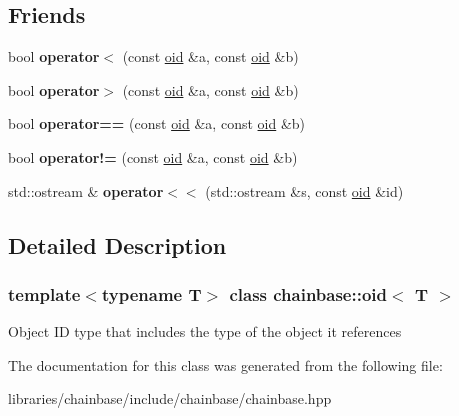 \subsection*{Friends}
\begin{DoxyCompactItemize}
\item 
\mbox{\label{classchainbase_1_1oid_a6d9c7528aadb2de19fed3a45e2879489}} 
bool {\bfseries operator$<$} (const \mbox{\hyperlink{classchainbase_1_1oid}{oid}} \&a, const \mbox{\hyperlink{classchainbase_1_1oid}{oid}} \&b)
\item 
\mbox{\label{classchainbase_1_1oid_a9d142ffef79ede7ed5cba5f2ceaf82d4}} 
bool {\bfseries operator$>$} (const \mbox{\hyperlink{classchainbase_1_1oid}{oid}} \&a, const \mbox{\hyperlink{classchainbase_1_1oid}{oid}} \&b)
\item 
\mbox{\label{classchainbase_1_1oid_a38ea3ec2aef1c7b8b22256ec9d5d803c}} 
bool {\bfseries operator==} (const \mbox{\hyperlink{classchainbase_1_1oid}{oid}} \&a, const \mbox{\hyperlink{classchainbase_1_1oid}{oid}} \&b)
\item 
\mbox{\label{classchainbase_1_1oid_a2246a3405acf474936cad2ad58cea4f4}} 
bool {\bfseries operator!=} (const \mbox{\hyperlink{classchainbase_1_1oid}{oid}} \&a, const \mbox{\hyperlink{classchainbase_1_1oid}{oid}} \&b)
\item 
\mbox{\label{classchainbase_1_1oid_a9169f8414fb0789d56dfdf2f3b0c0e0d}} 
std\+::ostream \& {\bfseries operator$<$$<$} (std\+::ostream \&s, const \mbox{\hyperlink{classchainbase_1_1oid}{oid}} \&id)
\end{DoxyCompactItemize}


\subsection{Detailed Description}
\subsubsection*{template$<$typename T$>$\newline
class chainbase\+::oid$<$ T $>$}

Object ID type that includes the type of the object it references 

The documentation for this class was generated from the following file\+:\begin{DoxyCompactItemize}
\item 
libraries/chainbase/include/chainbase/chainbase.\+hpp\end{DoxyCompactItemize}
